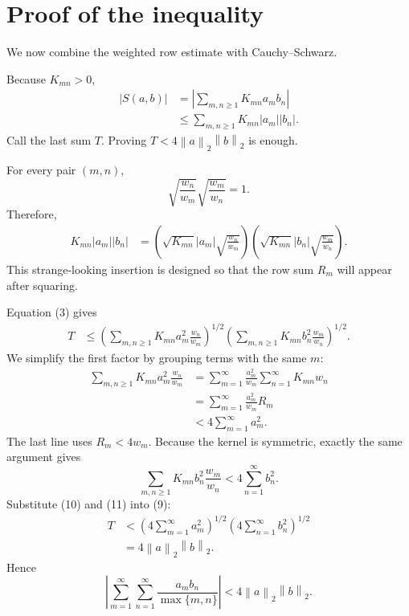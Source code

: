 \documentclass[11pt]{article}
\newcommand{\norm}[1]{\left\lVert #1\right\rVert}
\newcommand{\abs}[1]{\left|#1\right|}
\begin{document}
\section{Proof of the inequality}

We now combine the weighted row estimate with Cauchy--Schwarz.

\begin{solutionBox}
Because \(K_{mn}>0\),
\[
\begin{aligned}
 \abs{S(a,b)}
 &=\abs{\sum_{m,n\geq1}K_{mn}a_mb_n}\\
 &\leq \sum_{m,n\geq1}K_{mn}|a_m||b_n|.
\end{aligned}
\]
Call the last sum \(T\). Proving \(T<4\norm a_2\norm b_2\) is enough.
\end{solutionBox}

\begin{solutionBox}
For every pair \((m,n)\),
\[
 \sqrt{\frac{w_n}{w_m}}
 \sqrt{\frac{w_m}{w_n}}=1.
\]
Therefore,
\[
\begin{aligned}
 K_{mn}|a_m||b_n|
 &=\left(\sqrt{K_{mn}}|a_m|\sqrt{\frac{w_n}{w_m}}\right)
   \left(\sqrt{K_{mn}}|b_n|\sqrt{\frac{w_m}{w_n}}\right).
\end{aligned}
\]
This strange-looking insertion is designed so that the row sum \(R_m\) will appear after squaring.
\end{solutionBox}

\begin{solutionBox}
Equation (3) gives
\[
\begin{aligned}
 T
 &\leq
 \left(\sum_{m,n\geq1}
 K_{mn}a_m^2\frac{w_n}{w_m}\right)^{1/2}
 \left(\sum_{m,n\geq1}
 K_{mn}b_n^2\frac{w_m}{w_n}\right)^{1/2}.
\end{aligned}
\tag{9}
\]
We simplify the first factor by grouping terms with the same \(m\):
\[
\begin{aligned}
 \sum_{m,n\geq1}K_{mn}a_m^2\frac{w_n}{w_m}
 &=\sum_{m=1}^{\infty}\frac{a_m^2}{w_m}
   \sum_{n=1}^{\infty}K_{mn}w_n\\
 &=\sum_{m=1}^{\infty}\frac{a_m^2}{w_m}R_m\\
 &<4\sum_{m=1}^{\infty}a_m^2.
\end{aligned}
\tag{10}
\]
The last line uses \(R_m<4w_m\). Because the kernel is symmetric, exactly the same argument gives
\[
 \sum_{m,n\geq1}K_{mn}b_n^2\frac{w_m}{w_n}
 <4\sum_{n=1}^{\infty}b_n^2.
 \tag{11}
\]
Substitute (10) and (11) into (9):
\[
\begin{aligned}
 T
 &<\left(4\sum_{m=1}^{\infty}a_m^2\right)^{1/2}
    \left(4\sum_{n=1}^{\infty}b_n^2\right)^{1/2}\\
 &=4\norm a_2\norm b_2.
\end{aligned}
\]
Hence
\[
 \boxed{\displaystyle
 \abs{\sum_{m=1}^{\infty}\sum_{n=1}^{\infty}
 \frac{a_m b_n}{\max\{m,n\}}}
 <4\norm a_2\norm b_2.}
\]
\end{solutionBox}
\end{document}
